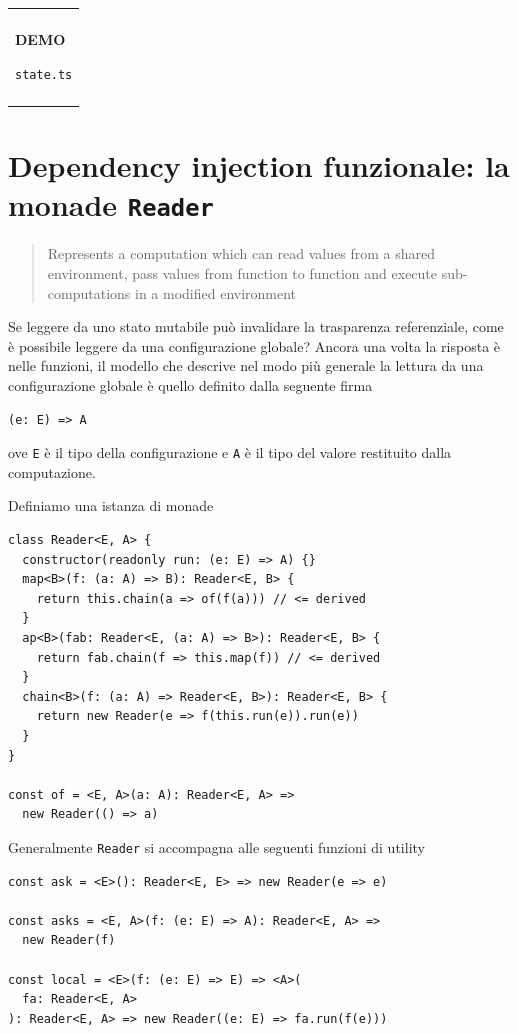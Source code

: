 \documentclass[12pt]{article}
\newenvironment{demo}
    {\begin{center}
    \begin{tabular}{|p{0.9\textwidth}|}
    \hline\\
    }
    {
    \\\\\hline
    \end{tabular}
    \end{center}
    }
\begin{document}
\begin{demo}
\begin{center}
\textbf{DEMO}

\texttt{state.ts}
\end{center}
\end{demo}

\newpage

\section{Dependency injection funzionale: la monade \texttt{Reader}}

\begin{quote}
Represents a computation which can read values from a shared environment, pass values from function to function
and execute sub-computations in a modified environment
\end{quote}

Se leggere da uno stato mutabile può invalidare la trasparenza referenziale, come è possibile leggere da una configurazione globale?
Ancora una volta la risposta è nelle funzioni, il modello che descrive nel modo più generale la lettura da una configurazione globale
è quello definito dalla seguente firma

\begin{verbatim}
(e: E) => A
\end{verbatim}

ove \texttt{E} è il tipo della configurazione e \texttt{A} è il tipo del valore restituito dalla computazione.

Definiamo una istanza di monade

\begin{verbatim}
class Reader<E, A> {
  constructor(readonly run: (e: E) => A) {}
  map<B>(f: (a: A) => B): Reader<E, B> {
    return this.chain(a => of(f(a))) // <= derived
  }
  ap<B>(fab: Reader<E, (a: A) => B>): Reader<E, B> {
    return fab.chain(f => this.map(f)) // <= derived
  }
  chain<B>(f: (a: A) => Reader<E, B>): Reader<E, B> {
    return new Reader(e => f(this.run(e)).run(e))
  }
}

const of = <E, A>(a: A): Reader<E, A> =>
  new Reader(() => a)
\end{verbatim}

Generalmente \texttt{Reader} si accompagna alle seguenti funzioni di utility

\begin{verbatim}
const ask = <E>(): Reader<E, E> => new Reader(e => e)

const asks = <E, A>(f: (e: E) => A): Reader<E, A> =>
  new Reader(f)

const local = <E>(f: (e: E) => E) => <A>(
  fa: Reader<E, A>
): Reader<E, A> => new Reader((e: E) => fa.run(f(e)))
\end{verbatim}
\end{document}

